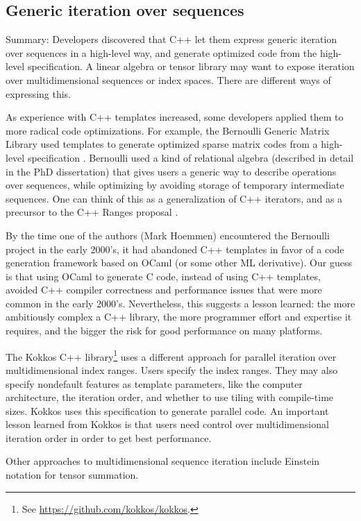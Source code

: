 \subsection{Generic iteration over sequences}
\label{SS:features:iteration}

Summary: Developers discovered that C++ let them express generic
iteration over sequences in a high-level way, and generate optimized
code from the high-level specification.  A linear algebra or tensor
library may want to expose iteration over multidimensional sequences
or index spaces.  There are different ways of expressing this.

As experience with C++ templates increased, some developers applied
them to more radical code optimizations.  For example, the Bernoulli
Generic Matrix Library used templates to generate optimized sparse
matrix codes from a high-level specification \cite{Ahmed2000}.
Bernoulli used a kind of relational algebra (described in detail in
the PhD dissertation) that gives users a generic way to describe
operations over sequences, while optimizing by avoiding storage of
temporary intermediate sequences.  One can think of this as a
generalization of C++ iterators, and as a precursor to the C++ Ranges
proposal \cite{Niebler2018}.

By the time one of the authors (Mark Hoemmen) encountered the
Bernoulli project in the early 2000's, it had abandoned C++ templates
in favor of a code generation framework based on OCaml (or some other
ML derivative).  Our guess is that using OCaml to generate C code,
instead of using C++ templates, avoided C++ compiler correctness and
performance issues that were more common in the early 2000's.
Nevertheless, this suggests a lesson learned: the more ambitiously
complex a C++ library, the more programmer effort and expertise it
requires, and the bigger the risk for good performance on many
platforms.

The Kokkos C++ library\footnote{See
  \url{https://github.com/kokkos/kokkos}.} uses a different approach
for parallel iteration over multidimensional index ranges.  Users
specify the index ranges.  They may also specify nondefault features
as template parameters, like the computer architecture, the iteration
order, and whether to use tiling with compile-time sizes.  Kokkos uses
this specification to generate parallel code.  An important lesson
learned from Kokkos is that users need control over multidimensional
iteration order in order to get best performance.

Other approaches to multidimensional sequence iteration include
Einstein notation for tensor summation.
%
%

